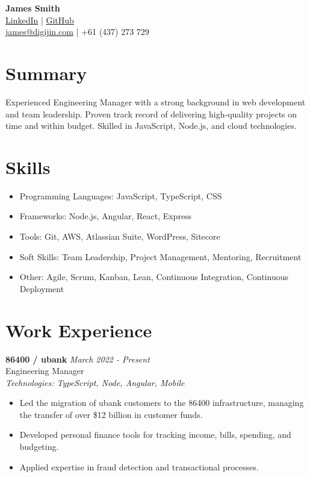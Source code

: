\documentclass[a4paper,10pt]{article}
\begin{document}
\begin{center}
    {\Huge \textbf{James Smith}} \\
    \href{https://www.linkedin.com/in/digijin/}{LinkedIn} | \href{https://github.com/digijin}{GitHub} \\
    \href{mailto:james@digijin.com}{james@digijin.com} | +61 (437) 273 729
\end{center}

\section*{Summary}
Experienced Engineering Manager with a strong background in web development and team leadership. Proven track record of delivering high-quality projects on time and within budget. Skilled in JavaScript, Node.js, and cloud technologies.

\section*{Skills}
\begin{itemize}
    \item Programming Languages: JavaScript, TypeScript, CSS
    \item Frameworks: Node.js, Angular, React, Express
    \item Tools: Git, AWS, Atlassian Suite, WordPress, Sitecore
    \item Soft Skills: Team Leadership, Project Management, Mentoring, Recruitment
    \item Other: Agile, Scrum, Kanban, Lean, Continuous Integration, Continuous Deployment
\end{itemize}

\section*{Work Experience}

\textbf{86400 / ubank} \hfill \textit{March 2022 - Present} \\
Engineering Manager \\
\textit{Technologies: TypeScript, Node, Angular, Mobile}
\begin{itemize}
    \item Led the migration of ubank customers to the 86400 infrastructure, managing the transfer of over \$12 billion in customer funds.
    \item Developed personal finance tools for tracking income, bills, spending, and budgeting.
    \item Applied expertise in fraud detection and transactional processes.
\end{itemize}
\end{document}
